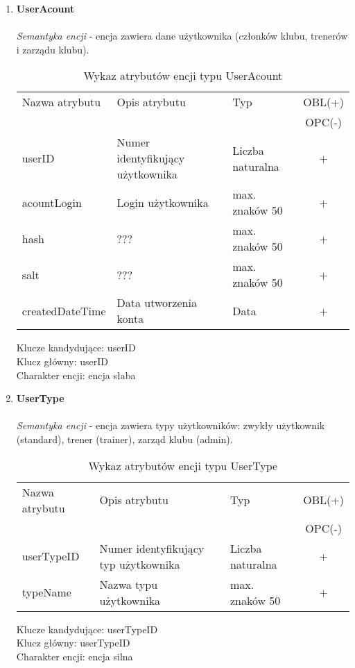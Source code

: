 \documentclass[12pt,twoside]{report}
\begin{document}
\begin{enumerate}[start=10,label={\bfseries ENC$\backslash$0\arabic*}]
	\item \textbf{UserAcount}\\ \\
\textit{Semantyka encji} - encja zawiera dane użytkownika (członków klubu, trenerów i zarządu klubu).
\begin{table}[h!]
	\centering
	\begin{tabular}{|l|l|l|c|}
		\hline
		Nazwa atrybutu & Opis atrybutu & Typ & OBL(+) \\
		& & &  OPC(-) \\
		\hline
		userID & Numer identyfikujący użytkownika & Liczba naturalna & + \\
		\hline
		acountLogin & Login użytkownika & max. znaków 50 & + \\
		\hline
		hash & ??? & max. znaków 50 & + \\
		\hline
		salt & ??? & max. znaków 50 & + \\
		\hline
		createdDateTime & Data utworzenia konta & Data & + \\
		\hline
	\end{tabular}
	\caption{Wykaz atrybutów encji typu UserAcount }
\end{table}
Klucze kandydujące: userID \\
Klucz główny: userID \\
Charakter encji: encja słaba \\

\item \textbf{UserType} \\ \\
\textit{Semantyka encji} - encja zawiera typy użytkowników: zwykły użytkownik (standard), trener (trainer), zarząd klubu (admin).
\begin{table}[h!]
	\centering
	\begin{tabular}{|l|l|l|c|}			
		\hline
		Nazwa atrybutu & Opis atrybutu & Typ & OBL(+) \\
		& & &  OPC(-) \\
		\hline
		userTypeID & Numer identyfikujący typ użytkownika & Liczba naturalna & + \\
		\hline
		typeName & Nazwa typu użytkownika & max. znaków 50 & + \\
		\hline
	\end{tabular}
	\caption{Wykaz atrybutów encji typu UserType }
\end{table}
Klucze kandydujące: userTypeID \\
Klucz główny: userTypeID \\
Charakter encji: encja silna \\


\end{enumerate}
\end{document}
